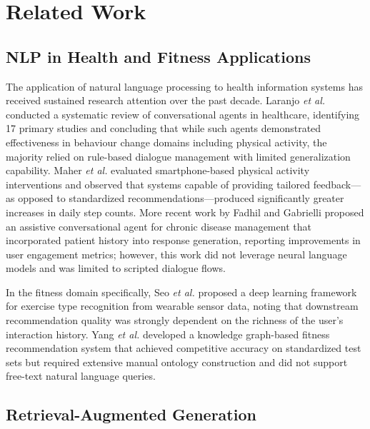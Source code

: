 \documentclass[conference]{IEEEtran}
\begin{document}
\section{Related Work}

\subsection{NLP in Health and Fitness Applications}

The application of natural language processing to health information systems has received sustained research attention over the past decade. Laranjo \textit{et al.} \cite{laranjo2018conversational} conducted a systematic review of conversational agents in healthcare, identifying 17 primary studies and concluding that while such agents demonstrated effectiveness in behaviour change domains including physical activity, the majority relied on rule-based dialogue management with limited generalization capability. Maher \textit{et al.} \cite{maher2015smartphone} evaluated smartphone-based physical activity interventions and observed that systems capable of providing tailored feedback—as opposed to standardized recommendations—produced significantly greater increases in daily step counts. More recent work by Fadhil and Gabrielli \cite{fadhil2017assistive} proposed an assistive conversational agent for chronic disease management that incorporated patient history into response generation, reporting improvements in user engagement metrics; however, this work did not leverage neural language models and was limited to scripted dialogue flows.

In the fitness domain specifically, Seo \textit{et al.} \cite{seo2020exercise} proposed a deep learning framework for exercise type recognition from wearable sensor data, noting that downstream recommendation quality was strongly dependent on the richness of the user's interaction history. Yang \textit{et al.} \cite{yang2021fitness} developed a knowledge graph-based fitness recommendation system that achieved competitive accuracy on standardized test sets but required extensive manual ontology construction and did not support free-text natural language queries.

\subsection{Retrieval-Augmented Generation}
\end{document}
